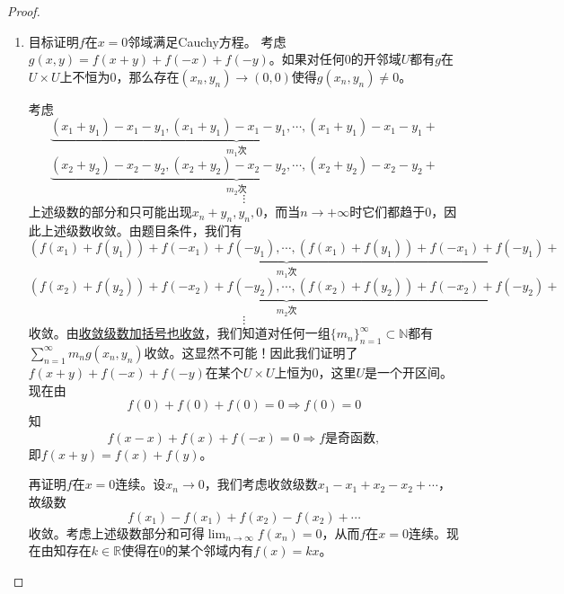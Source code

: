\documentclass[../../main.tex]{subfiles}%
\begin{document}
\begin{proof}
\begin{enumerate}
\item 目标证明$f$在$x=0$邻域满足Cauchy方程。
考虑$g(x,y)=f(x+y)+f(-x)+f(-y)$。如果对任何$0$的开邻域$U$都有$g$在$U\times U$上不恒为$0$，那么存在$(x_n,y_n)\to(0,0)$使得$g(x_n,y_n)\neq0$。

考虑
\[
\underbrace{(x_1+y_1)-x_1-y_1,(x_1+y_1)-x_1-y_1,\cdots,(x_1+y_1)-x_1-y_1}_{m_1次}+
\]
\[
\underbrace{(x_2+y_2)-x_2-y_2,(x_2+y_2)-x_2-y_2,\cdots,(x_2+y_2)-x_2-y_2}_{m_2次}+
\]
\[
\vdots
\]
上述级数的部分和只可能出现$x_n+y_n,y_n,0$，而当$n\to+\infty$时它们都趋于$0$，因此上述级数收敛。由题目条件，我们有
\[
\underbrace{(f(x_1)+f(y_1))+f(-x_1)+f(-y_1),\cdots,(f(x_1)+f(y_1))+f(-x_1)+f(-y_1)}_{m_1次}+
\]
\[
\underbrace{(f(x_2)+f(y_2))+f(-x_2)+f(-y_2),\cdots,(f(x_2)+f(y_2))+f(-x_2)+f(-y_2)}_{m_2次}+
\]
\[
\vdots
\]
收敛。由\hyperref[theorem:级数加括号的理解]{收敛级数加括号也收敛}，我们知道对任何一组$\{m_n\}_{n=1}^{\infty}\subset\mathbb{N}$都有$\sum_{n=1}^{\infty}m_ng(x_n,y_n)$收敛。这显然不可能！因此我们证明了$f(x+y)+f(-x)+f(-y)$在某个$U\times U$上恒为$0$，这里$U$是一个开区间。现在由
\[
f(0)+f(0)+f(0)=0\Rightarrow f(0)=0
\]
知
\[
f(x-x)+f(x)+f(-x)=0\Rightarrow f\text{是奇函数},
\]
即$f(x+y)=f(x)+f(y)$。

再证明$f$在$x=0$连续。设$x_n\to0$，我们考虑收敛级数$x_1-x_1+x_2-x_2+\cdots$，故级数
\[
f(x_1)-f(x_1)+f(x_2)-f(x_2)+\cdots
\]
收敛。考虑上述级数部分和可得$\lim_{n\to\infty}f(x_n)=0$，从而$f$在$x=0$连续。现在由知存在$k\in\mathbb{R}$使得在$0$的某个邻域内有$f(x)=kx$。
\end{enumerate}
\end{proof}
\end{document}
